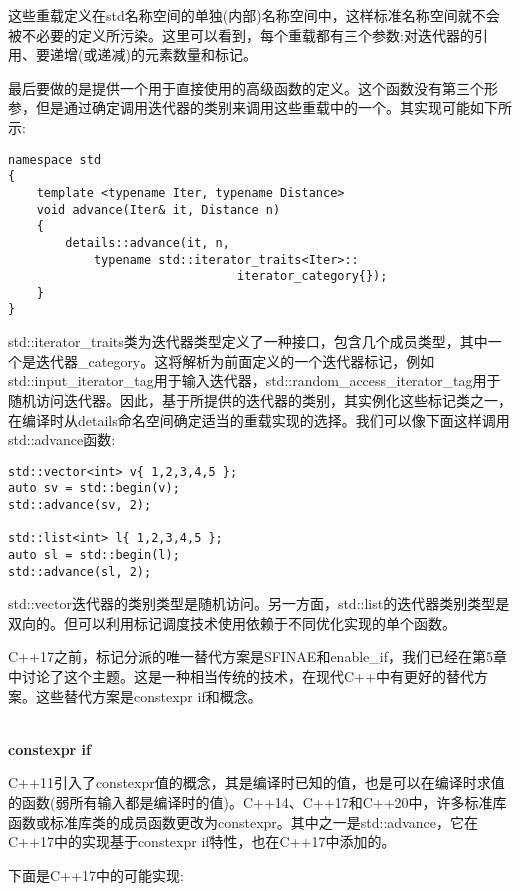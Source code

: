 这些重载定义在std名称空间的单独(内部)名称空间中，这样标准名称空间就不会被不必要的定义所污染。这里可以看到，每个重载都有三个参数:对迭代器的引用、要递增(或递减)的元素数量和标记。

最后要做的是提供一个用于直接使用的高级函数的定义。这个函数没有第三个形参，但是通过确定调用迭代器的类别来调用这些重载中的一个。其实现可能如下所示:

\begin{lstlisting}[style=styleCXX]
namespace std
{
	template <typename Iter, typename Distance>
	void advance(Iter& it, Distance n)
	{
		details::advance(it, n,
			typename std::iterator_traits<Iter>::
								iterator_category{});
	}
}
\end{lstlisting}

std::iterator\_traits类为迭代器类型定义了一种接口，包含几个成员类型，其中一个是迭代器\_category。这将解析为前面定义的一个迭代器标记，例如std::input\_iterator\_tag用于输入迭代器，std::random\_access\_iterator\_tag用于随机访问迭代器。因此，基于所提供的迭代器的类别，其实例化这些标记类之一，在编译时从details命名空间确定适当的重载实现的选择。我们可以像下面这样调用std::advance函数:

\begin{lstlisting}[style=styleCXX]
std::vector<int> v{ 1,2,3,4,5 };
auto sv = std::begin(v);
std::advance(sv, 2);

std::list<int> l{ 1,2,3,4,5 };
auto sl = std::begin(l);
std::advance(sl, 2);
\end{lstlisting}

std::vector迭代器的类别类型是随机访问。另一方面，std::list的迭代器类别类型是双向的。但可以利用标记调度技术使用依赖于不同优化实现的单个函数。


C++17之前，标记分派的唯一替代方案是SFINAE和enable\_if，我们已经在第5章中讨论了这个主题。这是一种相当传统的技术，在现代C++中有更好的替代方案。这些替代方案是constexpr if和概念。

\noindent
\hspace*{\fill} \\ %
\textbf{constexpr if}

C++11引入了constexpr值的概念，其是编译时已知的值，也是可以在编译时求值的函数(弱所有输入都是编译时的值)。C++14、C++17和C++20中，许多标准库函数或标准库类的成员函数更改为constexpr。其中之一是std::advance，它在C++17中的实现基于constexpr if特性，也在C++17中添加的。

下面是C++17中的可能实现:

